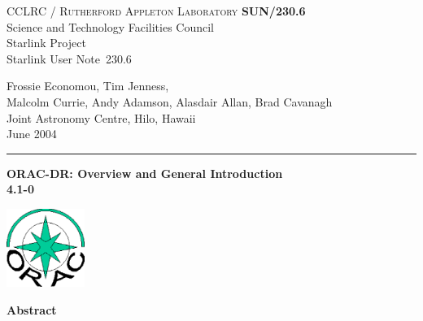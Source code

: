 \documentclass[twoside,11pt]{article}
\newcommand{\stardoccategory}  {Starlink User Note}
\newcommand{\stardocinitials}  {SUN}
\newcommand{\stardocnumber}    {230.6}
\newcommand{\stardocauthors}   {Frossie Economou, Tim Jenness,\\
Malcolm Currie, Andy Adamson, Alasdair Allan, Brad Cavanagh\\
Joint Astronomy Centre, Hilo, Hawaii}
\newcommand{\stardocdate}      {June 2004}
\newcommand{\stardoctitle}     {ORAC-DR: Overview and General Introduction}
\newcommand{\stardocversion}   {4.1-0}
\newcommand{\stardocmanual}    {}
\newcommand{\stardocname}{\stardocinitials /\stardocnumber}
\newenvironment{latexonly}{}{}
\renewcommand{\_}{\texttt{\symbol{95}}}
\begin{document}
\thispagestyle{empty}

\begin{latexonly}
   CCLRC / \textsc{Rutherford Appleton Laboratory} \hfill \textbf{\stardocname}\\
   {\large Science and Technology Facilities Council}\\
   {\large Starlink Project\\}
   {\large \stardoccategory\ \stardocnumber}
   \begin{flushright}
   \stardocauthors\\
   \stardocdate
   \end{flushright}
   \vspace{-4mm}
   \rule{\textwidth}{0.5mm}
   \vspace{5mm}
   \begin{center}
   {\Huge\textbf{\stardoctitle \\ [2.5ex]}}
   {\LARGE\textbf{\stardocversion \\ [4ex]}}
   {\Huge\textbf{\stardocmanual}}
   \end{center}
   \vspace{5mm}

\begin{center}
\includegraphics[width=1.0in]{sun230_logo.eps}
\end{center}

   \vspace{10mm}
   \begin{center}
      {\Large\textbf{Abstract}}
   \end{center}
\end{latexonly}
\end{document}
